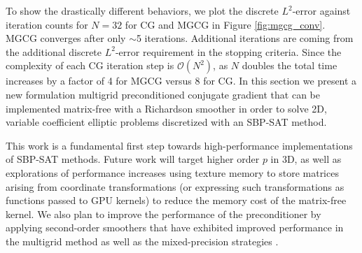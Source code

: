 To show the drastically different behaviors, we plot the discrete $\mathit{L}^2$-error against iteration counts for $N = 32$ for CG and MGCG in Figure \ref{fig:mgcg_conv}.
MGCG converges after only $\sim$5 iterations. Additional iterations are coming from the additional discrete $\mathit{L}^2$-error requirement in the stopping criteria.
Since the complexity of each CG iteration step is $\mathcal{O}(N^2)$, as $N$ doubles the total time increases by a factor of 4 for MGCG versus 8 for CG. 
In this section we present a new formulation multigrid preconditioned conjugate gradient that can be implemented matrix-free with a Richardson smoother in order to solve 2D, variable coefficient elliptic problems discretized with an SBP-SAT method. 



This work is a fundamental first step towards high-performance implementations of SBP-SAT methods.  Future work will target higher order $p$ in 3D, as well as explorations of performance increases using texture memory to store matrices arising from coordinate transformations (or expressing such transformations as functions passed to GPU kernels) to reduce the memory cost of the matrix-free kernel. We also plan to improve the performance of the preconditioner by applying second-order smoothers that have exhibited improved performance in the multigrid method as well as the mixed-precision strategies \citep{golub1961chebyshev,gutknecht2002chebyshev,abdelfattah2021survey}.


